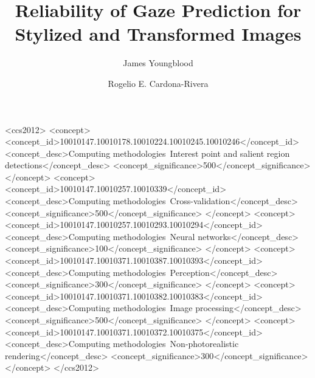 \documentclass[sigconf]{acmart}
\begin{document}
\author{James Youngblood}

\author{Rogelio E. Cardona-Rivera}

\title{Reliability of Gaze Prediction for Stylized and Transformed Images}


\begin{CCSXML}
	<ccs2012>
	<concept>
	<concept_id>10010147.10010178.10010224.10010245.10010246</concept_id>
	<concept_desc>Computing methodologies~Interest point and salient region detections</concept_desc>
	<concept_significance>500</concept_significance>
	</concept>
	<concept>
	<concept_id>10010147.10010257.10010339</concept_id>
	<concept_desc>Computing methodologies~Cross-validation</concept_desc>
	<concept_significance>500</concept_significance>
	</concept>
	<concept>
	<concept_id>10010147.10010257.10010293.10010294</concept_id>
	<concept_desc>Computing methodologies~Neural networks</concept_desc>
	<concept_significance>100</concept_significance>
	</concept>
	<concept>
	<concept_id>10010147.10010371.10010387.10010393</concept_id>
	<concept_desc>Computing methodologies~Perception</concept_desc>
	<concept_significance>300</concept_significance>
	</concept>
	<concept>
	<concept_id>10010147.10010371.10010382.10010383</concept_id>
	<concept_desc>Computing methodologies~Image processing</concept_desc>
	<concept_significance>500</concept_significance>
	</concept>
	<concept>
	<concept_id>10010147.10010371.10010372.10010375</concept_id>
	<concept_desc>Computing methodologies~Non-photorealistic rendering</concept_desc>
	<concept_significance>300</concept_significance>
	</concept>
	</ccs2012>
\end{CCSXML}


\end{document}
